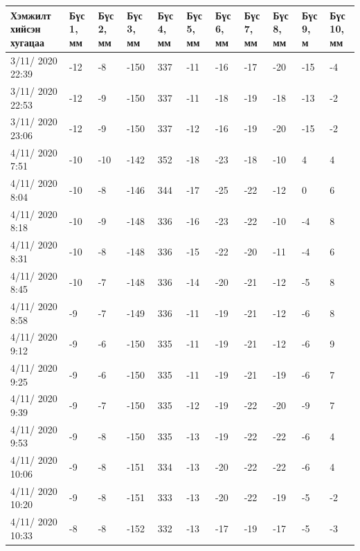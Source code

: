 \begin{table}[h]
    \centering
    \begin{tabular}{|p{1.5cm}|p{0.8cm}|p{0.8cm}|p{0.8cm}|p{0.8cm}|p{0.8cm}|p{0.8cm}|p{0.8cm}|p{0.8cm}|p{0.8cm}|p{0.8cm}|}
         \hline
     Хэмжилт хийсэн хугацаа & Бүс 1, мм&	Бүс 2, мм&	Бүс 3, мм&	Бүс 4, мм&	Бүс 5, мм&	Бүс 6, мм&	Бүс 7, мм&	Бүс 8, мм&	Бүс 9, м&	Бүс 10, мм \\ \hline
3/11/ 2020 22:39&	-12&-8&	-150&337&-11&-16&-17&-20&-15&	-4 \\ \hline
3/11/ 2020 22:53&	-12&-9&	-150&337&-11&-18&-19&-18&-13&	-2 \\ \hline
3/11/ 2020 23:06&	-12&-9&	-150&337&-12&-16&-19&-20&-15&	-2 \\ \hline
4/11/ 2020 7:51&	-10&-10&-142&352&-18&-23&-18&-10&4&	4 \\ \hline
4/11/ 2020 8:04&	-10&-8&	-146&344&-17&-25&-22&-12&0&	6 \\ \hline
4/11/ 2020 8:18&	-10&-9&	-148&336&-16&-23&-22&-10&-4&	8 \\ \hline
4/11/ 2020 8:31&	-10&-8&	-148&336&-15&-22&-20&-11&-4&	6 \\ \hline
4/11/ 2020 8:45&	-10&-7&	-148&336&-14&-20&-21&-12&-5&	8 \\ \hline
4/11/ 2020 8:58&	-9&	-7&	-149&336&-11&-19&-21&-12&-6&	8 \\ \hline
4/11/ 2020 9:12&	-9&	-6&	-150&335&-11&-19&-21&-12&-6&	9 \\ \hline
4/11/ 2020 9:25&	-9&	-6&	-150&335&-11&-19&-21&-19&-6&	7 \\ \hline
4/11/ 2020 9:39&	-9&	-7&	-150&335&-12&-19&-22&-20&-9&	7 \\ \hline
4/11/ 2020 9:53&	-9&	-8&	-150&335&-13&-19&-22&-22&-6&	4 \\ \hline
4/11/ 2020 10:06&	-9&	-8&	-151&334&-13&-20&-22&-22&-6&	4 \\ \hline
4/11/ 2020 10:20&	-9&	-8&	-151&333&-13&-20&-22&-19&-5&	-2 \\ \hline
4/11/ 2020 10:33&	-8&	-8&	-152&332&-13&-17&-19&-17&-5&	-3 \\ \hline
    \end{tabular}
\end{table}
